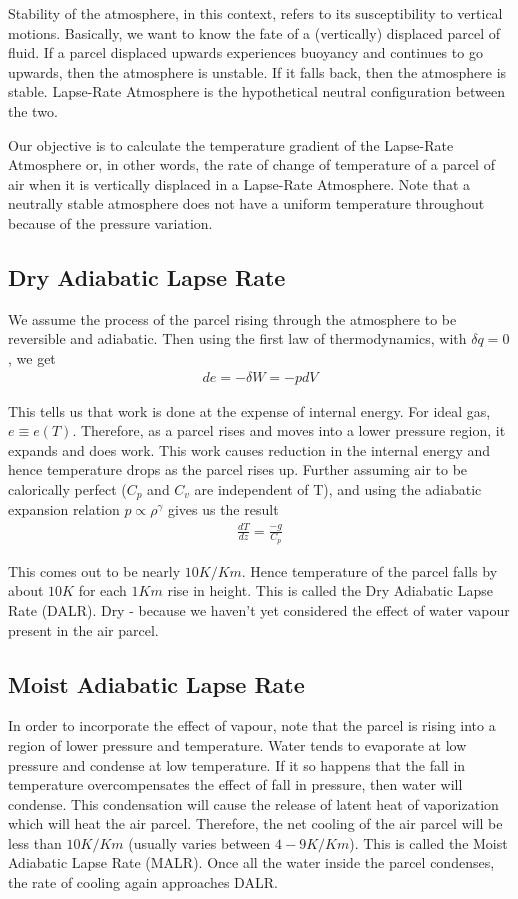 \documentclass[11pt,a4paper]{article}
\begin{document}
Stability of the atmosphere, in this context, refers to its susceptibility to vertical motions. Basically, we want to know the fate of a (vertically) displaced parcel of fluid. If a parcel displaced upwards experiences buoyancy and continues to go upwards, then the atmosphere is unstable. If it falls back, then the atmosphere is stable. Lapse-Rate Atmosphere is the hypothetical neutral configuration between the two.

Our objective is to calculate the temperature gradient of the Lapse-Rate Atmosphere or, in other words, the rate of change of temperature of a parcel of air when it is vertically displaced in a Lapse-Rate Atmosphere. Note that a neutrally stable atmosphere does not have a uniform temperature throughout because of the pressure variation. 
\subsection{Dry Adiabatic Lapse Rate}
We assume the process of the parcel rising through the atmosphere to be reversible and adiabatic. Then using the first law of thermodynamics, with $\delta q=0$, we get
\begin{align*}
de = -\delta W = -p dV
\end{align*}

This tells us that work is done at the expense of internal energy. For ideal gas, $e\equiv e(T)$. Therefore, as a parcel rises and moves into a lower pressure region, it expands and does work. This work causes reduction in the internal energy and hence temperature drops as the parcel rises up. Further assuming air to be calorically perfect ($C_p$ and $C_v$ are independent of T), and using the adiabatic expansion relation $p \propto \rho^{\gamma}$ gives us the result
\begin{align*}
\frac{dT}{dz} = \frac{-g}{C_p}
\end{align*}

This comes out to be nearly $10 K/Km$. Hence temperature of the parcel falls by about $10K$ for each $1 Km$ rise in height. This is called the Dry Adiabatic Lapse Rate (DALR). Dry - because we haven't yet considered the effect of water vapour present in the air parcel. 

\subsection{Moist Adiabatic Lapse Rate}

In order to incorporate the effect of vapour, note that the parcel is rising into a region of lower pressure and temperature. Water tends to evaporate at low pressure and condense at low temperature. If it so happens that the fall in temperature overcompensates the effect of fall in pressure, then water will condense. This condensation will cause the release of latent heat of vaporization which will heat the air parcel. Therefore, the net cooling of the air parcel will be less than $10K/Km$ (usually varies between $4 - 9 K/Km$). This is called the Moist Adiabatic Lapse Rate (MALR). Once all the water inside the parcel condenses, the rate of cooling again approaches DALR.
\end{document}
